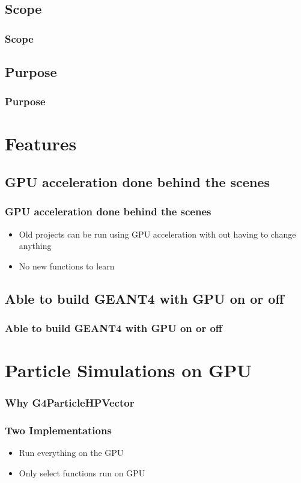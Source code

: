 \documentclass{beamer}
\begin{document}
\subsection{Scope}
\begin{frame}
\frametitle{Scope}
\end{frame}

\subsection{Purpose}
\begin{frame}
\frametitle{Purpose}
\end{frame}


\section{Features}
\subsection{GPU acceleration done behind the scenes}
\begin{frame}
\frametitle{GPU acceleration done behind the scenes}
\begin{itemize}
\item Old projects can be run using GPU acceleration with out having to change anything 
\item No new functions to learn
\end{itemize}
\end{frame}

\subsection{Able to build GEANT4 with GPU on or off}
\begin{frame}
\frametitle{Able to build  GEANT4 with GPU on or off}
\end{frame}

\section{Particle Simulations on GPU}
\begin{frame}
\frametitle{Why G4ParticleHPVector}
\end{frame}

\begin{frame}
\frametitle{Two Implementations}
\begin{itemize}
\item Run everything on the GPU
\item Only select functions run on GPU
\end{itemize}
\end{frame}
\end{document}

